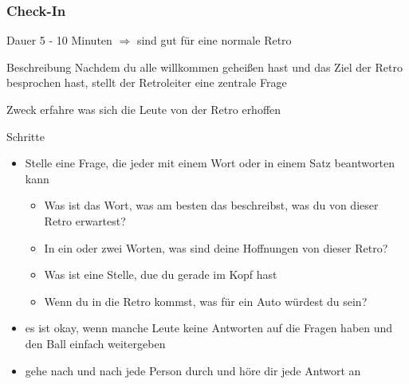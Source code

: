 \subsubsection{Check-In}
\begin{Beschreibungfett}[Beschreibung]
  \item [Dauer] 5 - 10 Minuten $\Rightarrow$  sind gut für eine normale Retro
  \item [Beschreibung] Nachdem du alle willkommen geheißen hast und das Ziel der Retro besprochen hast, stellt der Retroleiter eine zentrale Frage
  \item [Zweck] erfahre was sich die Leute von der Retro erhoffen
  \item [Schritte]
    \begin{itemize}
      \item Stelle eine Frage, die jeder mit einem Wort oder in einem Satz beantworten kann
        \begin{itemize}
          \item Was ist das Wort, was am besten das beschreibst, was du von dieser Retro
            erwartest?
          \item In ein oder zwei Worten, was sind deine Hoffnungen von dieser Retro?
          \item Was ist eine Stelle, due du gerade im Kopf hast
          \item Wenn du in die Retro kommst, was für ein Auto würdest du sein?
        \end{itemize}
      \item es ist okay, wenn manche Leute keine Antworten auf die Fragen haben und den Ball
        einfach weitergeben
      \item gehe nach und nach jede Person durch und höre dir jede Antwort an
    \end{itemize}
\end{Beschreibungfett}


